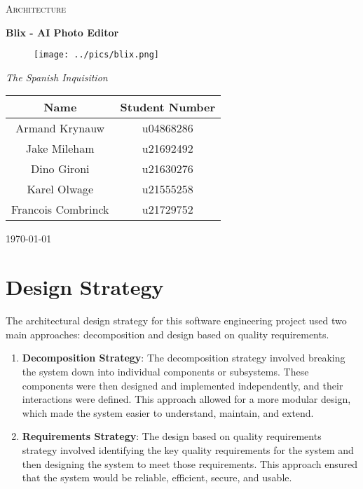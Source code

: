 \documentclass[11pt,a4paper]{article}
\begin{document}
\begin{titlepage}
	\centering
    {\scshape\LARGE Architecture\par}
    \vspace{1.5cm}
    {\huge\bfseries Blix - AI Photo Editor\par}
    \begin{figure}[h]
        \centering %
        \texttt{[image: ../pics/blix.png]}
    \end{figure}
    \vspace{2.5cm}
    {\Large\itshape The Spanish Inquisition\par}
	\begin{tabular}{|c|c|}
		\hline
		\textbf{Name} 		& \textbf{Student Number} \\
		\hline
		Armand Krynauw		& u04868286  \\
		Jake Mileham		& u21692492  \\
		Dino Gironi			& u21630276  \\
		Karel Olwage		& u21555258  \\
		Francois Combrinck	& u21729752  \\
		\hline
	\end{tabular}
    \vfill
    {\large \today\par}
\end{titlepage}

\tableofcontents
\pagebreak


\section{Design Strategy}
The architectural design strategy for this software engineering project used two
main approaches: decomposition and design based on quality requirements.

\begin{enumerate}[label*=\arabic*.]
	\item[\textbullet] {\bf Decomposition Strategy}: The decomposition strategy
	involved breaking the system down into individual components or subsystems.
	These components were then designed and implemented independently, and their
	interactions were defined. This approach allowed for a more modular design,
	which made the system easier to understand, maintain, and extend.

	\item[\textbullet] {\bf Requirements Strategy}: The design based on quality
	requirements strategy involved identifying the key quality requirements for
	the system and then designing the system to meet those requirements. This
	approach ensured that the system would be reliable, efficient, secure, and
	usable.
\end{enumerate}
\end{document}
